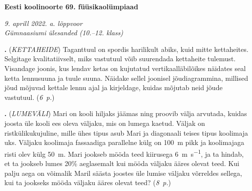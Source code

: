 \documentclass[11pt,a5paper]{article}
\newcommand{\numb}[1]{\vspace{5pt}\textbf{\large #1}}
\newcommand{\nimi}[1]{(\textsl{\small #1})}
\newcommand{\punktid}[1]{(\emph{#1~p.})}
\newcounter{ylesanne}
\newcommand{\yl}[1]{\addtocounter{ylesanne}{1}\numb{\theylesanne.} \nimi{#1} \newblock{}}
\newcommand{\autor}[1]{}%
\begin{document}
\begin{center}
  \textbf{\Large Eesti koolinoorte 69. füüsikaolümpiaad} \par
  \emph{9. aprill 2022. a. lõppvoor\\Gümnaasiumi ülesanded (10.--12. klass)}
\end{center}

 \par

\yl{KETTAHEIDE}
Taganttuul on spordis harilikult abiks, kuid mitte kettaheites. Selgitage kvalitatiivselt, miks vastutuul võib suurendada kettaheite tulemust. Visandage joonis, kus lendav ketas on kujutatud vertikaalläbilõikes näidates seal ketta lennusuuna ja tuule suuna. Näidake sellel joonisel jõudiagrammina, millised jõud mõjuvad kettale lennu ajal ja kirjeldage, kuidas mõjutab neid jõude vastutuul.
\punktid{6} \autor{Jaan Kalda}

\yl{LUMEVÄLI}
Mari on kooli hiljaks jäämas ning proovib välja arvutada, kuidas joosta üle kooli ees oleva väljaku, mis on lumega kaetud. Väljak on ristkülikukujuline, mille ühes tipus asub Mari ja diagonaali teises tipus koolimaja uks. Väljaku koolimaja fassaadiga parallelne külg on \SI{100}{\metre} pikk ja koolimajaga risti olev külg \SI{50}{\metre}. Mari jookseb mööda teed kiirusega \SI{6}{\metre\per\second}, ja ta hindab, et ta jookseb lumes 20\% aeglasemalt kui mööda väljaku ääres olevat teed. Kui palju aega on võimalik Maril säästa joostes üle lumise väljaku võrreldes sellega, kui ta jookseks mööda väljaku ääres olevat teed?
\punktid{8} \autor{Moorits Mihkel Muru}
\end{document}
